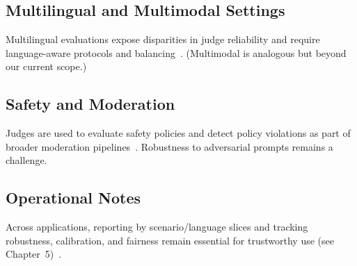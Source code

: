 \subsection{Multilingual and Multimodal Settings}
Multilingual evaluations expose disparities in judge reliability and require language-aware protocols and balancing~\cite{hada2024metal}. (Multimodal is analogous but beyond our current scope.)

\subsection{Safety and Moderation}
Judges are used to evaluate safety policies and detect policy violations as part of broader moderation pipelines~\cite{li2024_llmsasjudges}. Robustness to adversarial prompts remains a challenge.

\subsection{Operational Notes}
Across applications, reporting by scenario/language slices and tracking robustness, calibration, and fairness remain essential for trustworthy use (see Chapter~5)~\cite{liang2022helm, bavaresco2024judgebench}.